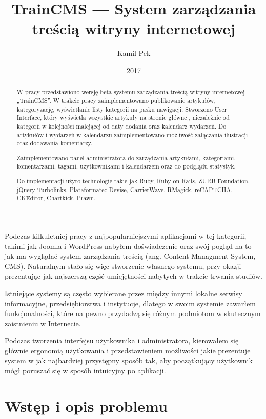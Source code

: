 \documentclass[openright]{xmgr}
\author   {Kamil Pek}
\title    {TrainCMS --- System zarządzania treścią witryny internetowej}
\date     {2017}
\begin{document}
\begin{abstract}
W pracy przedstawiono wersję beta systemu zarządzania treścią witryny internetowej „TrainCMS”. W trakcie pracy zaimplementowano publikowanie artykułów, kategoryzację, wyświetlanie listy kategorii na pasku nawigacji. Stworzono User Interface, który wyświetla wszystkie artykuły na stronie głównej, niezależnie od kategorii w kolejności malejącej od daty dodania oraz kalendarz wydarzeń. Do artykułów i wydarzeń w kalendarzu zaimplementowano możliwość załączania ilustracji oraz dodawania komentarzy.

Zaimplementowano panel administratora do zarządzania artykułami, kategoriami, komentarzami, tagami, użytkownikami i kalendarzem oraz do podglądu statystyk.

Do implementacji użyto technologie takie jak Ruby, Ruby on Rails, ZURB Foundation, jQuery Turbolinks, Plataformatec Devise, CarrierWave, RMagick, reCAPTCHA, CKEditor, Chartkick, Prawn.
\end{abstract}


\maketitle

\introduction
Podczas kilkuletniej pracy z najpopularniejszymi aplikacjami w tej kategorii, takimi jak Joomla i WordPress nabyłem doświadczenie oraz swój pogląd na to jak ma wyglądać system zarządzania treścią (ang. Content Managment System, CMS). Naturalnym stało się więc stworzenie własnego systemu, przy okazji prezentując jak najszerszą część umiejętności nabytych w trakcie trwania studiów.

Istniejące systemy są często wybierane przez między innymi lokalne serwisy informacyjne, przedsiębiorstwa i instytucje, dlatego w swoim systemie zawarłem funkcjonalności, które na pewno przydadzą się różnym podmiotom w skutecznym zaistnieniu w Internecie.

Podczas tworzenia interfejsu użytkownika i administratora, kierowałem się głównie ergonomią użytkowania i przedstawieniem możliwości jakie prezentuje system w jak najbardziej przystępny sposób tak, aby początkujący użytkownik mógł poruszać się w sposób intuicyjny po aplikacji.

\chapter{Wstęp i opis problemu}
\end{document}

